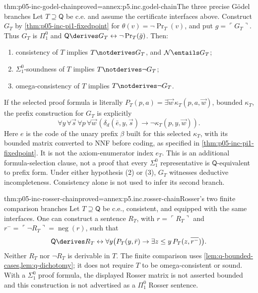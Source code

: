 \begin{hbtheorem}{thm:p05-inc-godel-chain}{proved=annex:p5.inc.godel-chain}{The three precise G\"odel branches}
Let \(T\supseteq\mathsf Q\) be c.e. and assume the certificate
interfaces above. Construct \(G_T\) by
\cref{thm:p05-inc-pi1-fixedpoint} for
\(\theta(v)=\neg\operatorname{Pr}_T(v)\), and put
\(g=\ulcorner G_T\urcorner\). Thus \(G_T\) is \(\Pi^0_1\) and
\(\mathsf Q\derives G_T\leftrightarrow\neg\operatorname{Pr}_T(\bar g)\).
Then:
\begin{enumerate}
\item consistency of \(T\) implies \(T\notderives G_T\), and
      \(\mathcal N\entails G_T\);
\item \(\Sigma^0_1\)-soundness of \(T\) implies
      \(T\notderives\neg G_T\);
\item omega-consistency of \(T\) implies
      \(T\notderives\neg G_T\).
\end{enumerate}
If the selected proof formula is literally
\(P_T(p,a)=\exists\vec w\,\kappa_T(p,a,\vec w)\), bounded
\(\kappa_T\), the prefix construction for \(G_T\) is explicitly
\[
 \forall y\,\forall\vec s\,\forall p\,\forall\vec w\,
 (\delta_d(\bar e,y,\vec s)\to
                         \neg\kappa_T(p,y,\vec w)).
\]
Here \(e\) is the code of the unary prefix \(\beta\) built for
this selected \(\kappa_T\), with its bounded matrix converted to
NNF before coding, as specified in
\cref{thm:p05-inc-pi1-fixedpoint}. It is not the axiom-enumerator
index \(e_T\).
This is an additional formula-selection clause, not a proof that every
\(\Sigma^0_1\) representative is \(\mathsf Q\)-equivalent to prefix
form. Under either hypothesis (2) or (3), \(G_T\) witnesses deductive
incompleteness. Consistency alone is not used to infer its second branch.
\end{hbtheorem}

\begin{hbtheorem}{thm:p05-inc-rosser-chain}{proved=annex:p5.inc.rosser-chain}{Rosser's two finite comparison branches}
Let \(T\supseteq\mathsf Q\) be c.e., consistent, and equipped with
the same interfaces. One can construct a sentence \(R_T\), with
\(r=\ulcorner R_T\urcorner\) and
\(r^-=\ulcorner\neg R_T\urcorner=\operatorname{neg}(r)\), such that
\[
 \mathsf Q\derives R_T\leftrightarrow
 \forall y\bigl(P_T(y,\bar r)\to
                   \exists z\leq y\,P_T(z,\overline{r^-})\bigr).
\]
Neither \(R_T\) nor \(\neg R_T\) is derivable in \(T\).
The finite comparison uses \cref{lem:q-bounded-cases,lem:q-dichotomy};
it does not require \(T\) to be omega-consistent or sound. With a
\(\Sigma^0_1\) proof formula, the displayed Rosser matrix is not
asserted bounded and this construction is not advertised as a
\(\Pi^0_1\) Rosser sentence.
\end{hbtheorem}

